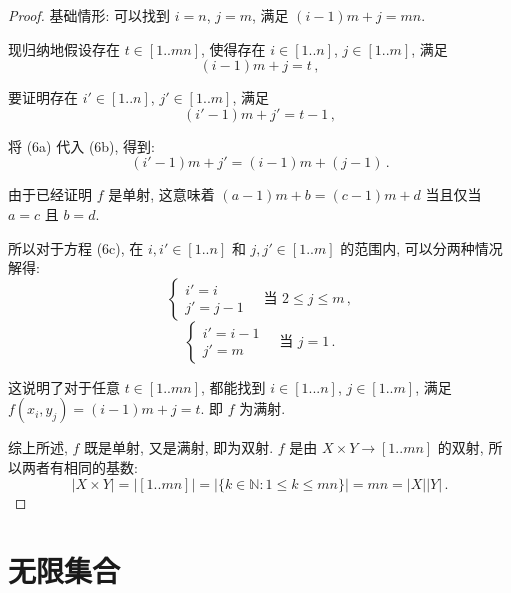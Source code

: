 \documentclass[UTF8]{ctexart}
\theoremstyle{mystyle}
\theoremstyle{myremark}
\theoremstyle{plain}
\newcommand{\N}{\mathbb N}
\newcommand{\set}[1]{\{#1\}}
\begin{document}
\begin{proof}
    基础情形: 可以找到 $ i = n $, $ j = m $, 满足 $ (i - 1) m + j = m n $.

    现归纳地假设存在 $ t \in [1 .. mn] $, 使得存在 $ i \in [1 .. n] $, $ j \in [1 .. m] $, 满足 \[ (i - 1) m + j = t \tag{6a} \,,\] 
    
    要证明存在 $ i' \in [1 .. n] $, $ j' \in [1 .. m] $, 满足 \[ (i' - 1) m + j' = t - 1 \tag{6b} \,,\]

    将 (6a) 代入 (6b), 得到:
    \[ (i' - 1) m + j' = (i - 1) m + (j - 1) \tag{6c} \,.\]

    由于已经证明 $ f $ 是单射, 这意味着 $ (a - 1) m + b = (c - 1) m + d $ 当且仅当 $ a = c $ 且 $ b = d $. 
    
    所以对于方程 (6c), 在 $ i, i' \in [1 .. n] $ 和 $ j, j' \in [1 .. m] $ 的范围内, 可以分两种情况解得:
    \[ \begin{cases}
        i' = i \\
        j' = j - 1
    \end{cases} \quad \text{当 } 2 \leqslant j \leqslant m \,,\]
    \[ \begin{cases}
        i' = i - 1 \\
        j' = m
    \end{cases} \quad \text{当 } j = 1 \,.\]

    这说明了对于任意 $ t \in [1 .. m n] $, 都能找到 $ i \in [1 ... n] $, $ j \in [1 .. m] $, 满足 $ f(x_i, y_j) = (i - 1) m + j = t $. 即 $ f $ 为满射.

    综上所述, $ f $ 既是单射, 又是满射, 即为双射. $ f $ 是由 $ X \times Y \to [1 .. mn] $ 的双射, 所以两者有相同的基数:
    \[ |X \times Y| = |[1 .. mn]| = |\set{k \in \N \colon 1 \leqslant k \leqslant mn}| = m n = |X| |Y| \,.\]
\end{proof}





\section{无限集合}
\end{document}
